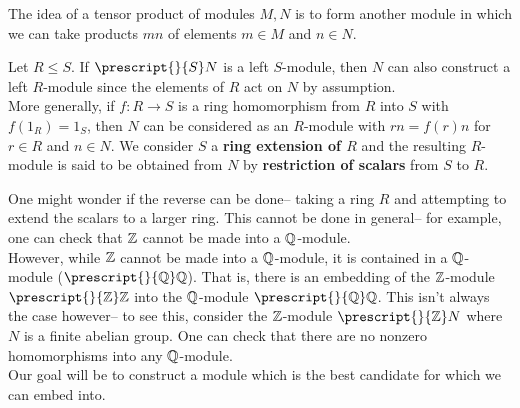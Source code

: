 \documentclass{memoir}
\begin{document}


The idea of a tensor product of modules \(M,N\) is to form another module in which we can take products \(mn\) of elements \(m \in M\) and \(n \in N\).

\begin{defn}
	Let \(R\leq S\). If \(\prescript{}{S}N\) is a left \(S\)-module, then \(N\) can also construct a left \(R\)-module since the elements of \(R\) act on \(N\) by assumption.\\

	More generally, if \(f:R\to S\) is a ring homomorphism from \(R\) into \(S\) with \(f(1_R) = 1_S\), then \(N\) can be considered as an \(R\)-module with \(rn = f(r)n\) for \(r \in R\) and \(n \in N\). We consider \(S\) a \textbf{ring extension of \(R\)} and the resulting \(R\)-module is said to be obtained from \(N\) by \textbf{restriction of scalars} from \(S\) to \(R\).
\end{defn}
One might wonder if the reverse can be done-- taking a ring \(R\) and attempting to extend the scalars to a larger ring. This cannot be done in general-- for example, one can check that \(\mathbb{Z}\) cannot be made into a \(\mathbb{Q}\)-module.\\

However, while \(\mathbb{Z}\) cannot be made into a \(\mathbb{Q}\)-module, it is contained in a \(\mathbb{Q}\)-module (\(\prescript{}{\Q}\Q\)). That is, there is an embedding of the \(\mathbb{Z}\)-module \(\prescript{}{\Z}\Z\) into the \(\mathbb{Q}\)-module \(\prescript{}{\Q}\Q\). This isn't always the case however-- to see this, consider the \(\mathbb{Z}\)-module \(\prescript{}{\Z}N\) where \(N\) is a finite abelian group. One can check that there are no nonzero homomorphisms into any \(\mathbb{Q}\)-module.\\

Our goal will be to construct a module which is the best candidate for which we can embed into.
\end{document}
